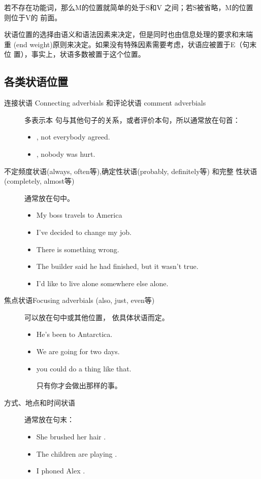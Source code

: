 若不存在功能词，那么M的位置就简单的处于S和V 之间；若S被省略，M的位置则位于V的
前面。

状语位置的选择由语义和语法因素来决定，但是同时也由信息处理的要求和末端
重 (end weight)原则来决定。如果没有特殊因素需要考虑，状语应被置于E（句末位
置），事实上，状语多数被置于这个位置。

\subsection{各类状语位置}

\begin{description}
\item[连接状语 Connecting adverbials 和评论状语 comment adverbials] 多表示本
  句与其他句子的关系，或者评价本句，所以通常放在句首：
  \begin{itemize}
  \item {}, not everybody agreed.

  \item {}, nobody was hurt.
  \end{itemize}

\item[不定频度状语(always, often等),确定性状语(probably, definitely等) 和完整
  性状语 (completely, almost等)] 通常放在句中。
  \begin{itemize}
  \item My boss  travels to America
  \item I've  decided to change my job.
  \item There is  something wrong.
  \item The builder said he had  finished, but it wasn't true.
  \item {} I'd like to live alone somewhere else alone.
  \end{itemize}

\item[焦点状语Focusing adverbials (also, just, even等)]可以放在句中或其他位置，
  依具体状语而定。
  \begin{itemize}
  \item He's  been to Antarctica.

  \item We are  going for two days.


  \item {} you could do a thing like that.

    只有你才会做出那样的事。
  \end{itemize}
\item[方式、地点和时间状语] 通常放在句末：
  \begin{itemize}
  \item She brushed her hair .
  \item The children are playing .
  \item I phoned Alex .
  \end{itemize}


\end{description}
